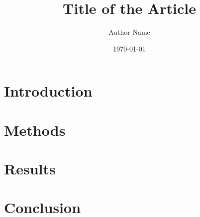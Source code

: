 \documentclass{article}
\title{Title of the Article}
\author{Author Name}
\date{\today}
\begin{document}
\maketitle

\section{Introduction}

\section{Methods}

\section{Results}

\section{Conclusion}

\printbibliography %
\end{document}
